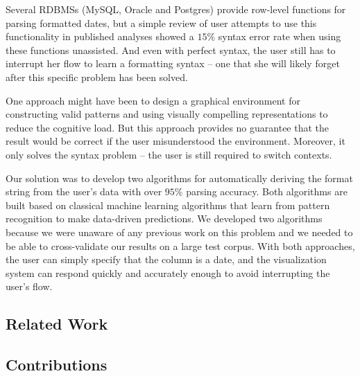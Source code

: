 Several RDBMSs (\eg MySQL, Oracle and Postgres) provide row-level functions for parsing formatted dates, but a simple review of user attempts to use this functionality in published analyses showed a $15\%$ syntax error rate when using these functions unassisted. And even with perfect syntax, the user still has to interrupt her flow to learn a formatting syntax -- one that she will likely forget after this specific problem has been solved.

One approach might have been to design a graphical environment for constructing valid patterns and using visually compelling representations to reduce the cognitive load. 
But this approach provides no guarantee that the result would be correct if the user misunderstood the environment. 
Moreover, it only solves the syntax problem -- the user is still required to switch contexts.

Our solution was to develop two algorithms for automatically deriving the format string from the user's data with over $95\%$ parsing accuracy. Both algorithms are built based on classical machine learning algorithms that learn from pattern recognition to make data-driven predictions. We developed two algorithms because we were unaware of any previous work on this problem and we needed to be able to cross-validate our results on a large test corpus. With both approaches, the user can simply specify that the column is a date, and the visualization system can respond quickly and accurately enough to avoid interrupting the user's flow.

\subsection{Related Work}


\subsection{Contributions}

